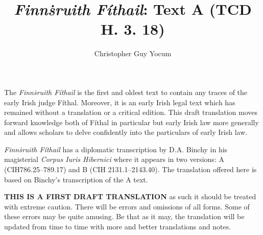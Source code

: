 \documentclass[11pt]{article}
\author{Christopher Guy Yocum}
\title{\emph{Finn\.{s}ruith F\'{i}thail}: Text A (TCD H. 3. 18)}
\begin{document}
\maketitle

The \emph{Finn\.{s}ruith F\'{i}thail} is the first and oldest text to contain any traces of the early Irish judge F\'{i}thal.  Moreover, it is an early Irish legal text which has remained without a translation or a critical edition.  This draft translation moves forward knowledge both of F\'{i}thal in particular but early Irish law more generally and allows scholars to delve confidently into the particulars of early Irish law.

\emph{Finn\.{s}ruith F\'{i}thail} has a diplomatic transcription by D.A. Binchy in his magisterial \emph{Corpus Iuris Hibernici} where it appears in two versions: A (CIH786.25--789.17) and B (CIH 2131.1--2143.40).  The translation offered here is based on Binchy's transcription of the A text.

\Large \textbf{THIS IS A FIRST DRAFT TRANSLATION} as such it should be treated with extreme caution.  There will be errors and omissions of all forms.  Some of these errors may be quite amusing.  Be that as it may, the translation will be updated from time to time with more and better translations and notes.

\newpage
\end{document}
